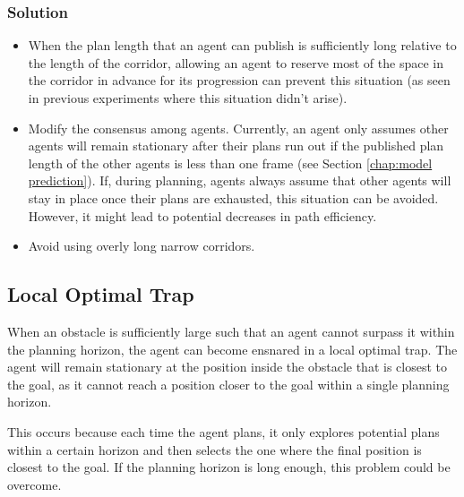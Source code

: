 \subsubsection{Solution}

\begin{itemize}
    \item
    When the plan length that an agent can publish is sufficiently long relative to the length of the corridor, allowing an agent to reserve most of the space in the corridor in advance for its progression can prevent this situation (as seen in previous experiments where this situation didn't arise).
    \item 
    Modify the consensus among agents. Currently, an agent only assumes other agents will remain stationary after their plans run out if the published plan length of the other agents is less than one frame (see Section \ref{chap:model prediction}). If, during planning, agents always assume that other agents will stay in place once their plans are exhausted, this situation can be avoided. However, it might lead to potential decreases in path efficiency.
    \item 
    Avoid using overly long narrow corridors.
\end{itemize}


\subsection{Local Optimal Trap}

When an obstacle is sufficiently large such that an agent cannot surpass it within the planning horizon, the agent can become ensnared in a local optimal trap.
The agent will remain stationary at the position inside the obstacle that is closest to the goal, as it cannot reach a position closer to the goal within a single planning horizon.

This occurs because each time the agent plans, it only explores potential plans within a certain horizon and then selects the one where the final position is closest to the goal.
If the planning horizon is long enough, this problem could be overcome.

